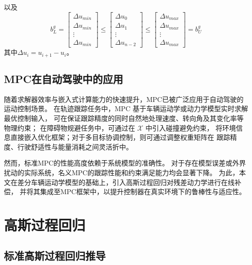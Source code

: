 以及
\begin{equation}
    b_L^g = 
    \begin{bmatrix}
        \Delta u_{min} \\ \Delta  u_{min} \\ \vdots \\ \Delta u_{min}
    \end{bmatrix} 
    \leq 
    \begin{bmatrix}  \Delta u_{0}  \\  \Delta  u_{1} \\ \vdots \\  \Delta u_{n-2} 
    \end{bmatrix} 
    \leq 
    \begin{bmatrix}\Delta  u_{max} \\ \Delta  u_{max}\\ \vdots \\ \Delta  u_{max}
    \end{bmatrix} = b_U^g
\end{equation}
其中$\Delta u_{i} = u_{i+1} - u_{i}$。

\subsection{MPC在自动驾驶中的应用}

随着求解器效率与嵌入式计算能力的快速提升，MPC已被广泛应用于自动驾驶的运动控制场景。
在轨迹跟踪任务中，MPC 基于车辆运动学或动力学模型实时求解最优控制输入，
可在保证跟踪精度的同时自然地处理速度、转向角及其变化率等物理约束；
在障碍物规避任务中，可通过在 $\mathcal{X}$ 中引入碰撞避免约束，
将环境信息直接嵌入优化框架；对于多目标协调控制，则可通过调整权重矩阵在
跟踪精度、行驶舒适性与能量消耗之间灵活折中。

然而，标准MPC的性能高度依赖于系统模型的准确性。
对于存在模型误差或外界扰动的实际系统，名义MPC的跟踪性能和约束满足能力均会显著下降。
为此，本文在差分车辆运动学模型的基础上，引入高斯过程回归对残差动力学进行在线补偿，
并将其集成至MPC框架中，以提升控制器在真实环境下的鲁棒性与适应性。

\section{高斯过程回归}

\subsection{标准高斯过程回归推导}

